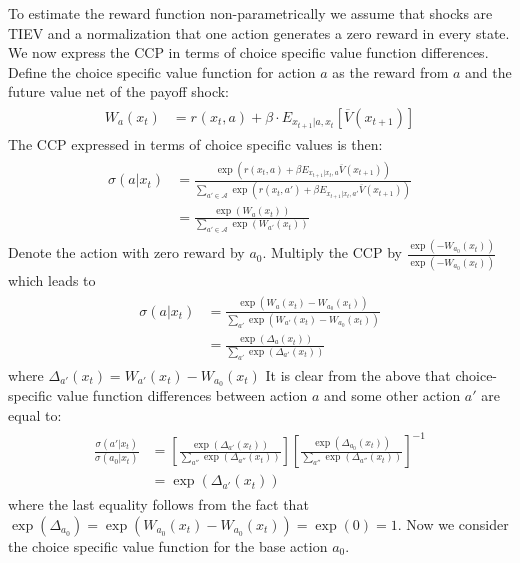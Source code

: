 \documentclass{article}
\begin{document}
To estimate the reward function non-parametrically we assume that shocks are TIEV and a normalization that one action generates a zero reward in every state. 
We now express the CCP in terms of choice specific value function differences. Define the choice specific value function for action $a$ as the reward from $a$ and the future value net of the payoff shock:
\begin{align}
\begin{split}
W_a(x_t) &= r_{}(x_t,a)+\beta  \cdot E_{x_{t+1}|a,x_t} \left[ \overline{V}(x_{t+1}) \right] 
\end{split}
\end{align}
The CCP expressed in terms of choice specific values is then:
\begin{align} 
\begin{split}
\sigma(a|x_t)&=\frac{\exp\left(r(x_t,a)+\beta E_{x_{t+1}|x_t,a} \overline{V}(x_{t+1})\right)}{\sum_{a'\in\mathcal{A}} \exp\left(r(x_t,a')+\beta E_{x_{t+1}|x_t,a'} \overline{V}(x_{t+1})\right)}\\
&=\frac{\exp(W_a(x_t))}{\sum_{a'\in\mathcal{A}} \exp(W_{a'}(x_t))}
\end{split}
\end{align}
Denote the action with zero reward by $a_0$. Multiply the CCP by $\frac{\exp(-W_{a_0}(x_t))}{\exp(-W_{a_0}(x_t))}$ which leads to  
\begin{align}
\begin{split}
\sigma(a|x_t)&=\frac{\exp(W_a(x_t)-W_{a_0}(x_t))}{\sum_{a'} \exp(W_{a'}(x_t)-W_{a_0}(x_t))}\\
&=\frac{\exp(\Delta_a(x_t))}{\sum_{a'} \exp(\Delta_{a'}(x_t))}
\end{split}
\end{align}
where $\Delta_{a'}(x_t)=W_{a'}(x_t)-W_{a_0}(x_t)$
It is clear from the above that choice-specific value function differences between action $a$ and some other action $a'$ are equal to:
\begin{align}\label{eq:ccp_ratio}
\begin{split}
\frac{\sigma(a'|x_t)}{\sigma(a_0|x_t)}&=
\left[
\frac
  {\exp(\Delta_{a'}(x_t))}
  {\sum_{a''} \exp(\Delta_{a''}(x_t))}
\right]
\left[\frac{\exp(\Delta_{a_0}(x_t))}{\sum_{a''} \exp(\Delta_{a''}(x_t))}\right]^{-1}\\
&=\exp(\Delta_{a'}(x_t))
\end{split}
\end{align}
where the last equality follows from the fact that $\exp(\Delta_{a_0})=\exp(W_{a_0}(x_t)-W_{a_0}(x_t))=\exp(0)=1$.
Now we consider the choice specific value function for the base action $a_0$. 
\end{document}
